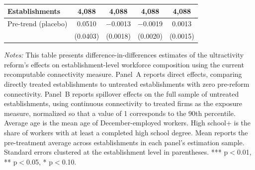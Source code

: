 \documentclass[11pt]{article}
\begin{document}
\begin{table}[H]
\begin{tabular}{lcccc}
Establishments & 4{,}088 & 4{,}088 & 4{,}088 & 4{,}088\\
\midrule
Pre-trend (placebo) & 0.0510 & $-$0.0013 & $-$0.0019 & 0.0013\\
 & (0.0403) & (0.0018) & (0.0020) & (0.0015)\\
\bottomrule\bottomrule
\end{tabular}
\begin{minipage}{\linewidth}\vspace{4pt}
\scriptsize\textit{Notes:} This table presents difference-in-differences estimates of the ultractivity reform's effects on establishment-level workforce composition using the current recomputable connectivity measure. Panel~A reports direct effects, comparing directly treated establishments to untreated establishments with zero pre-reform connectivity. Panel~B reports spillover effects on the full sample of untreated establishments, using continuous connectivity to treated firms as the exposure measure, normalized so that a value of 1 corresponds to the 90th percentile. Average age is the mean age of December-employed workers. High school+ is the share of workers with at least a completed high school degree. Mean reports the pre-treatment average across establishments in each panel's estimation sample. Standard errors clustered at the establishment level in parentheses. *** p$<$0.01, ** p$<$0.05, * p$<$0.10.
\end{minipage}
\end{table}
\end{document}
